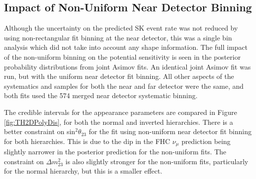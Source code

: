\subsection{Impact of Non-Uniform Near Detector Binning}\label{sec:jointpoly}

Although the uncertainty on the predicted SK event rate was not reduced by using non-rectangular fit binning at the near detector, this was a single bin analysis which did not take into account any shape information. The full impact of the non-uniform binning on the potential sensitivity is seen in the posterior probability distributions from joint Asimov fits. An identical joint Asimov fit was run, but with the uniform near detector fit binning. All other aspects of the systematics and samples for both the near and far detector were the same, and both fits used the 574 merged near detector systematic binning.

The credible intervals for the appearance parameters are compared in Figure \ref{fig:TH2DPolyDis}, for both the normal and inverted hierarchies. There is a better constraint on sin$^{2}\theta_{23}$ for the fit using non-uniform near detector fit binning for both hierarchies. This is due to the dip in the FHC $\nu_{\mu}$ prediction being slightly narrower in the posterior prediction for the non-uniform fits. The constraint on $\Delta m_{23}^{2}$ is also slightly stronger for the non-uniform fits, particularly for the normal hierarchy, but this is a smaller effect.

